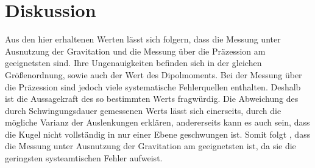 \section{Diskussion}
\label{sec:Diskussion}
Aus den hier erhaltenen Werten lässt sich folgern, dass die Messung unter Ausnutzung der Gravitation und die Messung über die Präzession am geeignetsten sind.
Ihre Ungenauigkeiten befinden sich in der gleichen Größenordnung, sowie auch der Wert des Dipolmoments.
Bei der Messung über die Präzession sind jedoch viele systematische Fehlerquellen enthalten.
Deshalb ist die Aussagekraft des so bestimmten Werts fragwürdig.
Die Abweichung des durch Schwingungsdauer gemessenen Werts lässt sich einerseits, durch die mögliche Varianz der Auslenkungen erklären, andererseits kann es auch sein, dass die Kugel nicht vollständig in nur einer Ebene geschwungen ist.
Somit folgt , dass die Messung unter Ausnutzung der Gravitation am geeignetsten ist, da sie die geringsten systeamtischen Fehler aufweist.

